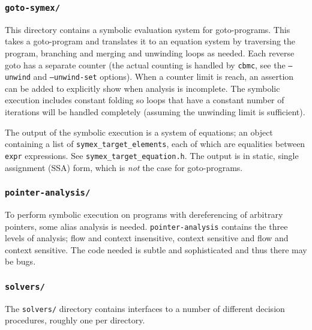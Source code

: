 \documentclass{article}
\newcommand{\dir}[1]{\texttt{#1}}
\newcommand{\file}[1]{\texttt{#1}}
\newcommand{\code}[1]{\texttt{#1}}
\newcommand{\prog}[1]{\texttt{#1}}
\begin{document}
\subsubsection{\dir{goto-symex/}}

This directory contains a symbolic evaluation system for
goto-programs.  This takes a goto-program and translates it to an
equation system by traversing the program, branching and merging and
unwinding loops as needed.  Each reverse goto has a separate counter
(the actual counting is handled by \prog{cbmc}, see the \code{--unwind}
and \code{--unwind-set} options).  When a counter limit
is reach, an assertion can be added to explicitly show when analysis
is incomplete.  The symbolic execution includes constant folding so
loops that have a constant number of iterations will be handled
completely (assuming the unwinding limit is sufficient).

The output of the symbolic execution is a system of equations; an
object containing a list of \code{symex\_target\_elements}, each of
which are equalities between \prog{expr} expressions.  See
\file{symex\_target\_equation.h}.  The output is in static, single
assignment (SSA) form, which is \emph{not} the case for goto-programs.



\subsubsection{\dir{pointer-analysis/}}

To perform symbolic execution on programs with dereferencing of
arbitrary pointers, some alias analysis is needed.
\dir{pointer-analysis} contains the three levels of analysis; flow and
context insensitive, context sensitive and flow and context
sensitive.  The code needed is subtle and sophisticated and thus there
may be bugs.




\subsubsection{\dir{solvers/}}

The \dir{solvers/} directory contains interfaces to a number of
different decision procedures, roughly one per directory.  
\end{document}
